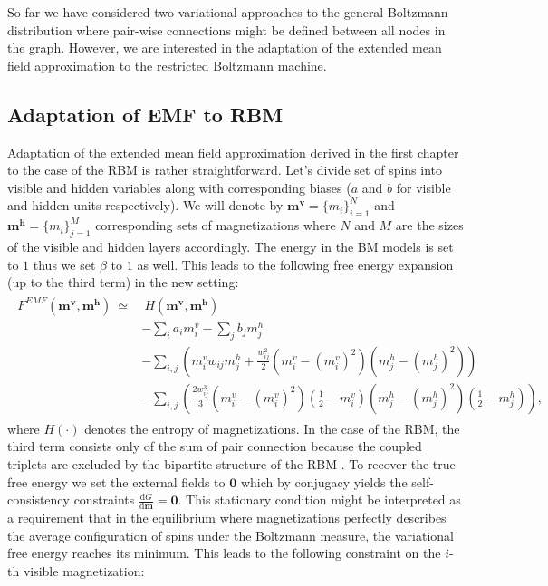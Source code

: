 \documentclass[../report/report.tex]{subfiles}
\begin{document}
So far we have considered two variational approaches to the general Boltzmann distribution where pair-wise connections might be defined between all nodes in the graph. However, we are interested in the adaptation of the extended mean field approximation to the restricted Boltzmann machine.

\subsection{Adaptation of EMF to RBM}
Adaptation of the extended mean field approximation derived in the first chapter to the case of the RBM is rather straightforward. Let's divide set of spins into visible  and hidden variables along with corresponding biases ($a$ and $b$ for visible and hidden units respectively). We will denote by $\mathbf{m}^\mathbf{v} = \{m_i \}_{i=1}^N$ and $\mathbf{m}^\mathbf{h} = \{m_i \}_{j=1}^M$ corresponding sets of magnetizations where $N$ and $M$ are the sizes of the visible and hidden layers accordingly. The energy in the BM models is set to $1$ thus we set $\beta$ to $1$ as well. This leads to the following free energy expansion (up to the third term) in the new setting:
\begin{align}
\begin{split}
F^{EMF}(\mathbf{m^v},\mathbf{m^h}) ~\simeq & ~H(\mathbf{m^v}, \mathbf{m^h}) \\
&  - \sum_i a_i m_i^v - \sum_j b_j m_j^h \\
 & - \sum_{i,j} \left( 
 m_i^v w_{ij} m_j^h +  \frac{w_{ij}^2}{2}(m_i^v - (m_i^v)^2)(m_j^h - (m_j^h)^2) 
  \right) \\
    &  - \sum_{i,j} \left( 
 \frac{2w_{ij}^3}{3}(m_i^v - (m_i^v)^2)(\frac{1}{2} - m_i^v)(m_j^h - (m_j^h)^2)(\frac{1}{2} - m_j^h)  \right), 
\label{eq:expansionRBM}
\end{split}
\end{align}
where $H(\cdot)$ denotes the entropy of magnetizations.
In the case of the RBM, the third term consists only of the sum of pair connection because the coupled triplets are excluded by the bipartite structure of the RBM \cite{gabrie2015training}. To recover the true free energy we set the external fields to $\mathbf{0}$ which by conjugacy yields the self-consistency constraints $\frac{\text{d}G}{\text{d} \mathbf{m}} = \mathbf{0}$.
This stationary condition might be interpreted as a requirement that in the equilibrium where magnetizations perfectly describes the average configuration of spins under the Boltzmann measure, the variational free energy reaches its minimum. This leads to the following constraint on the $i$-th visible magnetization:
\end{document}
